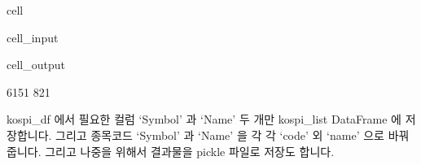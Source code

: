 \documentclass[letterpaper,10pt,english]{jupyterBook}
\begin{document}
\begin{sphinxuseclass}{cell}\begin{sphinxVerbatimInput}

\begin{sphinxuseclass}{cell_input}
\begin{sphinxVerbatim}[commandchars=\\\{\}]
\PYG{p}{[}\PYG{p}{]}
\PYG{p}{[}\PYG{p}{[}\PYG{p}{]}\PYG{p}{]}\PYG{p}{[}\PYG{p}{]}
\end{sphinxVerbatim}

\end{sphinxuseclass}\end{sphinxVerbatimInput}
\begin{sphinxVerbatimOutput}

\begin{sphinxuseclass}{cell_output}
\begin{sphinxVerbatim}[commandchars=\\\{\}]
6151
821
\end{sphinxVerbatim}

\end{sphinxuseclass}\end{sphinxVerbatimOutput}

\end{sphinxuseclass}
\sphinxAtStartPar
 kospi\_df 에서 필요한 컬럼 ‘Symbol’ 과 ‘Name’ 두 개만 kospi\_list DataFrame 에 저장합니다. 그리고 종목코드 ‘Symbol’ 과 ‘Name’ 을 각 각 ‘code’ 외 ‘name’ 으로 바꿔줍니다. 그리고 나중을 위해서 결과물을 pickle 파일로 저장도 합니다.
\end{document}
